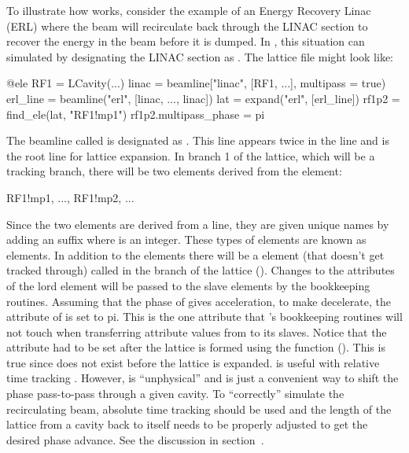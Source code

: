 To illustrate how  works, consider the example of an Energy Recovery Linac (ERL) where
the beam will recirculate back through the LINAC section to recover the energy in the beam before it
is dumped. In \accellat, this situation can simulated by designating the LINAC section as .
The lattice file might look like:
\begin{example}
  @ele RF1 = LCavity(...)
  linac = beamline["linac", [RF1, ...], multipass = true)
  erl_line = beamline("erl", [linac, ..., linac])
  lat = expand("erl", [erl_line])
  rf1p2 = find_ele(lat, "RF1!mp1")
  rf1p2.multipass_phase = pi
\end{example}
The beamline called  is designated as . This  line appears twice in
the line  and  is the root line for lattice expansion. 
In branch 1 of the 
lattice, which will be a tracking branch, there will be two elements derived from the  element:
\begin{example}
  RF1!mp1, ..., RF1!mp2, ...
\end{example}
Since the two elements are derived from a  line, they are given unique names by adding
an  suffix where  is an integer. 
These types of elements are known as  elements. In
addition to the  elements there will be a  element (that doesn't
get tracked through) called  in the  branch of the lattice ().
Changes to the attributes of the lord  element will be passed to the slave elements by the \accellat
bookkeeping routines. Assuming that the phase of  gives acceleration, to make 
decelerate, the  attribute of  is set to pi. This is the one attribute
that \accellat's bookkeeping routines will not touch when transferring attribute values from  to
its slaves. Notice that the  attribute had to be set after the lattice is formed
using the  function (). This is true since 
 does not exist before the lattice is expanded.  is useful with
relative time tracking . However,  is ``unphysical'' and is just
a convenient way to shift the phase pass-to-pass through a given cavity. To ``correctly'' simulate
the recirculating beam, absolute time tracking should be used and the length of the lattice from a
cavity back to itself needs to be properly adjusted to get the desired phase advance. See the discussion
in section~.

